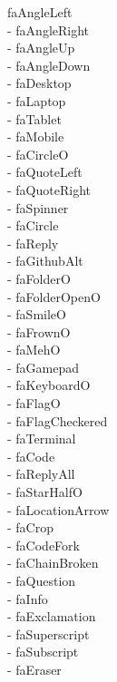 \documentclass[%
               doublesided,
               paper=a4,
               fontsize=10pt
              ]{my-resume}
\begin{document}
faAngleLeft\\ \faAngleRight - faAngleRight\\ \faAngleUp - faAngleUp\\ \faAngleDown - faAngleDown\\ \faDesktop - faDesktop\\ \faLaptop - faLaptop\\ \faTablet - faTablet\\ \faMobile - faMobile\\ \faCircleO - faCircleO\\ \faQuoteLeft - faQuoteLeft\\ \faQuoteRight - faQuoteRight\\ \faSpinner - faSpinner\\ \faCircle - faCircle\\ \faReply - faReply\\ \faGithubAlt - faGithubAlt\\ \faFolderO - faFolderO\\ \faFolderOpenO - faFolderOpenO\\ \faSmileO - faSmileO\\ \faFrownO - faFrownO\\ \faMehO - faMehO\\ \faGamepad - faGamepad\\ \faKeyboardO - faKeyboardO\\ \faFlagO - faFlagO\\ \faFlagCheckered - faFlagCheckered\\ \faTerminal - faTerminal\\ \faCode - faCode\\ \faReplyAll - faReplyAll\\ \faStarHalfO - faStarHalfO\\ \faLocationArrow - faLocationArrow\\ \faCrop - faCrop\\ \faCodeFork - faCodeFork\\ \faChainBroken - faChainBroken\\ \faQuestion - faQuestion\\ \faInfo - faInfo\\ \faExclamation - faExclamation\\ \faSuperscript - faSuperscript\\ \faSubscript - faSubscript\\ \faEraser - faEraser\\ 
\end{document}
